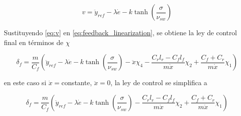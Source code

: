 \documentclass{article}
\begin{document}
\begin{equation}
v
=
\ddot y_{ref}
-\lambda\dot e
-k\tanh\left(\frac{\sigma}{\nu_{sw}}\right)
\label{eq:v}
\end{equation}

Sustituyendo \eqref{eq:v} en \eqref{eq:feedback_linearization}, se obtiene la ley de control final en términos de $\chi$

\begin{equation}
\boxed{
\delta_f=
\frac{m}{C_f}
\left(
\ddot y_{ref}
-\lambda\dot e
-k\tanh\left(\frac{\sigma}{\nu_{sw}}\right)
-\ddot{x}\chi_4
-\frac{C_r l_r-C_f l_f}{m\dot{x}}\chi_2
+\frac{C_f+C_r}{m\dot{x}}\chi_1
\right)
}
\label{eq:control_law}
\end{equation}

en este caso si $\dot{x}=$constante, $\ddot{x}=0 $, la ley de control se simplifica a

\begin{equation}
\boxed{
\delta_f=
\frac{m}{C_f}
\left(
\ddot y_{ref}
-\lambda\dot e
-k\tanh\left(\frac{\sigma}{\nu_{sw}}\right)
-\frac{C_r l_r-C_f l_f}{m\dot{x}}\chi_2
+\frac{C_f+C_r}{m\dot{x}}\chi_1
\right)
}
\label{eq:control_law_simplified}
\end{equation}
\end{document}
